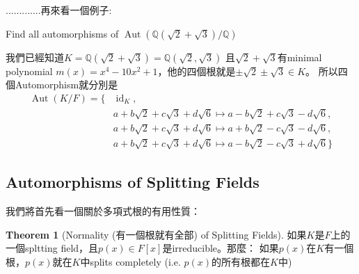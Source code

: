 \documentclass[12pt]{article}
\theoremstyle{definition}
\newtheorem{thm}{Theorem}
\newtheorem{prop}{Proposition}
\newcommand{\QQ}{\mathbb Q}
\DeclareMathOperator{\Aut}{Aut}
\DeclareMathOperator{\id}{id}
\begin{document}
.............再來看一個例子:

\begin{ex} Find all automorphisms of $\Aut(\QQ(\sqrt{2}+\sqrt{3})/\QQ)$

	我們已經知道$K=\QQ(\sqrt2+\sqrt3)=\QQ(\sqrt2,\sqrt3)$
	且$\sqrt2+\sqrt3$有minimal polynomial $m(x)=x^4-10x^2+1$，他的四個根就是$\pm\sqrt{2}\pm\sqrt{3}\in K$。
	所以四個Automorphism就分別是
	\begin{align*}
		\Aut(K/F)=\{
		 & \id_K,                                                                  \\
		 & a+b\sqrt{2}+c\sqrt{3}+d\sqrt{6}\mapsto a-b\sqrt{2}+c\sqrt{3}-d\sqrt{6}, \\
		 & a+b\sqrt{2}+c\sqrt{3}+d\sqrt{6}\mapsto a+b\sqrt{2}-c\sqrt{3}-d\sqrt{6}, \\
		 & a+b\sqrt{2}+c\sqrt{3}+d\sqrt{6}\mapsto a-b\sqrt{2}-c\sqrt{3}+d\sqrt{6}
		\}
	\end{align*}

\end{ex}








\subsection{Automorphisms of Splitting Fields}

我們將首先看一個關於多項式根的有用性質：
\begin{thm}[Normality (有一個根就有全部) of Splitting Fields]
	如果$K$是$F$上的一個spltting field，且$p(x)\in F[x]$是irreducible。那麼：
	如果$p(x)$在$K$有一個根，$p(x)$就在$K$中splits completely
	(i.e. $p(x)$的所有根都在$K$中)
\end{thm}
\end{document}

